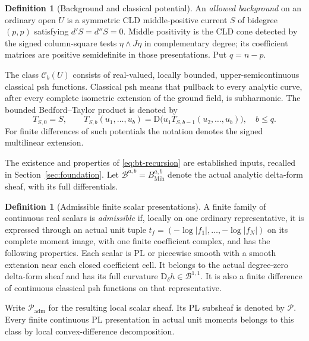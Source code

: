\documentclass[11pt,a4paper]{article}
\newcommand{\MathSecref}[1]{{\hypersetup{linkcolor=SectionLink}Section~\ref{#1}}}
\newcommand{\MathEqref}[1]{{\hypersetup{linkcolor=EquationLink}\eqref{#1}}}
\theoremstyle{definition}
\newtheorem{definition}[theorem]{Definition}
\theoremstyle{remark}
\numberwithin{equation}{section}
\newcommand{\D}{\mathrm D}
\newcommand{\Cb}{\mathcal C_b}
\newcommand{\B}{\mathscr B}
\begin{document}
\begin{definition}[Background and classical potential]
\label{def:background}
An \emph{allowed background} on an ordinary open $U$ is a symmetric
CLD middle-positive current $S$ of bidegree $(p,p)$ satisfying
$d'S=d''S=0$.  Middle positivity is the CLD cone detected by the signed
column-square tests $\eta\wedge J\eta$ in complementary degree; its
coefficient matrices are positive semidefinite in those presentations.
Put $q=n-p$.

The class $\Cb(U)$ consists of real-valued, locally bounded,
upper-semicontinuous classical psh functions.  Classical psh means that
pullback to every analytic curve, after every complete isometric
extension of the ground field, is subharmonic.  The bounded
Bedford--Taylor product is denoted by
\begin{equation}
 T_{S,0}=S,\qquad
 T_{S,b}(u_1,\ldots,u_b)
   =\D\bigl(u_1T_{S,b-1}(u_2,\ldots,u_b)\bigr),\quad b\le q.
 \label{eq:bt-recursion}
\end{equation}
For finite differences of such potentials the notation denotes the
signed multilinear extension.
\end{definition}

The existence and properties of \MathEqref{eq:bt-recursion} are
established inputs, recalled in \MathSecref{sec:foundation}.  Let
$\B^{a,b}=B^{a,b}_{\mathrm{Mih}}$ denote the actual analytic delta-form
sheaf, with its full differentials.

\begin{definition}[Admissible finite scalar presentations]
\label{def:admissible}
A finite family of continuous real scalars is \emph{admissible} if,
locally on one ordinary representative, it is expressed through an
actual unit tuple $t_f=(-\log|f_1|,\ldots,-\log|f_N|)$ on its complete
moment image, with one finite coefficient complex, and has the following
properties.  Each scalar is PL or piecewise smooth with a smooth
extension near each closed coefficient cell.  It belongs to the actual
degree-zero delta-form sheaf and has its full curvature
$\D_\delta h\in\B^{1,1}$.  It is also a finite difference of continuous
classical psh functions on that representative.

Write $\mathscr P_{\mathrm{adm}}$ for the resulting local scalar
sheaf.  Its PL subsheaf is denoted by $\mathscr P$.  Every finite
continuous PL presentation in actual unit moments belongs to this
class by local convex-difference decomposition.
\end{definition}
\end{document}
